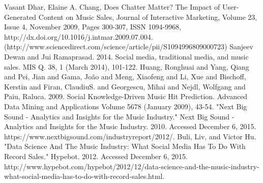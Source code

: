 \documentclass[conference]{IEEEtran}
\begin{document}
{%

%
%
%
\begin{thebibliography}{1}

Vasant Dhar, Elaine A. Chang, Does Chatter Matter? The Impact of User-Generated Content on Music Sales, Journal of Interactive Marketing, Volume 23, Issue 4, November 2009, Pages 300-307, ISSN 1094-9968, http://dx.doi.org/10.1016/j.intmar.2009.07.004.
(http://www.sciencedirect.com/science/article/pii/S1094996809000723)
Sanjeev Dewan and Jui Ramaprasad. 2014. Social media, traditional media, and music sales. MIS Q. 38, 1 (March 2014), 101-122.
Huang, Ronghuai and Yang, Qiang and Pei, Jian and Gama, João and Meng, Xiaofeng and Li, Xue and Bischoff, Kerstin and Firan, ClaudiuS. and Georgescu, Mihai and Nejdl, Wolfgang and Paiu, Raluca. 2009. Social Knowledge-Driven Music Hit Prediction. Advanced Data Mining and Applications Volume 5678 (January 2009), 43-54.
"Next Big Sound - Analytics and Insights for the Music Industry." Next Big Sound - Analytics and Insights for the Music Industry. 2010. Accessed December 6, 2015. https://www.nextbigsound.com/industryreport/2012/.
Buli, Liv, and Victor Hu. "Data Science And The Music Industry: What Social Media Has To Do With Record Sales." Hypebot. 2012. Accessed December 6, 2015. http://www.hypebot.com/hypebot/2012/12/data-science-and-the-music-industry-what-social-media-has-to-do-with-record-sales.html.




\end{thebibliography}

% 

}
\end{document}
